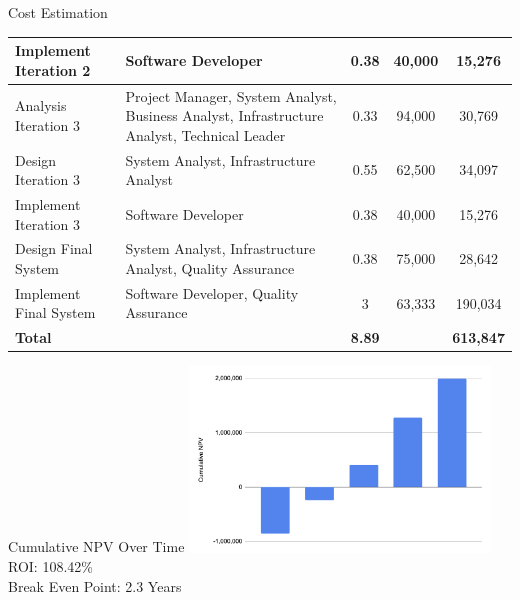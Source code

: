 \documentclass[aspectratio=169]{beamer}
\begin{document}
\begin{frame}{Cost Estimation}
{\begin{tabular}{|l|p{7cm}|c|c|c|}
            Implement Iteration 2  & Software Developer                                                                          & 0.38                   & 40,000                          & 15,276           \\
            \hline
            Analysis Iteration 3   & Project Manager, System Analyst, Business Analyst, Infrastructure Analyst, Technical Leader & 0.33                   & 94,000                          & 30,769           \\
            \hline
            Design Iteration 3     & System Analyst, Infrastructure Analyst                                                      & 0.55                   & 62,500                          & 34,097           \\
            \hline
            Implement Iteration 3  & Software Developer                                                                          & 0.38                   & 40,000                          & 15,276           \\
            \hline
            Design Final System    & System Analyst, Infrastructure Analyst, Quality Assurance                                   & 0.38                   & 75,000                          & 28,642           \\
            \hline
            Implement Final System & Software Developer, Quality Assurance                                                       & 3                      & 63,333                          & 190,034          \\
            \hline
            \textbf{Total}         &                                                                                             & \textbf{8.89}          &                                 & \textbf{613,847} \\
            \hline
        \end{tabular}
    }
\end{frame}

\begin{frame}{Cumulative NPV Over Time}
    \centering
    \includegraphics[width=0.6\textwidth]{barchart.png}
    \\
    ROI: 108.42\% \\
    Break Even Point: 2.3 Years

\end{frame}
\end{document}

